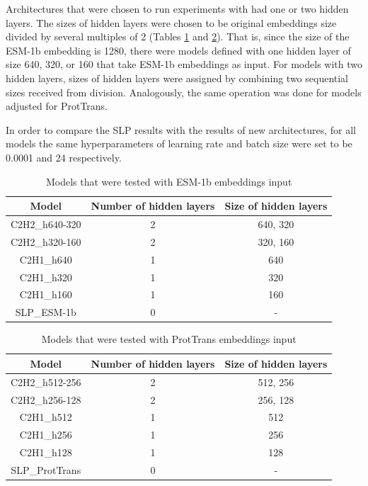\documentclass[12pt]{article}
\begin{document}
	Architectures that were chosen to run experiments with 
	had one or two hidden layers. The sizes of hidden layers 
	were chosen to be original embeddings size divided 
	by several multiples of 2 (Tables \ref{table:modelArchitecturesESM} 
	and \ref{table:modelArchitecturesPT}). That is, since the 
	size of the ESM-1b embedding is 1280, there were 
	models defined with one hidden layer of size 640, 320, or 160 
	that take ESM-1b embeddings as input. For models with two 
	hidden layers, sizes of hidden layers were assigned by 
	combining two sequential sizes received from division. 
	Analogously, the same operation was done for models adjusted 
	for ProtTrans.

	In order to compare the SLP results with the results of new 
	architectures, for all models the same hyperparameters 
	of learning rate and 
	batch size were set to be 0.0001 and 24 respectively.

	\begin{table}[h!]
		\caption{Models that were tested with ESM-1b embeddings input}
		\vspace{0.2cm}
		\centering
		\begin{tabular}{ | c | c c | }
			\hline 
			Model & Number of hidden layers & Size of hidden layers \\
			\hline 
			C2H2\_h640-320 & 2 & 640, 320 \\
			C2H2\_h320-160 & 2 & 320, 160 \\
			C2H1\_h640 & 1 & 640 \\
			C2H1\_h320 & 1 & 320 \\
			C2H1\_h160 & 1 & 160 \\
			SLP\_ESM-1b & 0 & - \\
			\hline    
		\end{tabular}
		\label{table:modelArchitecturesESM}
	\end{table}

	\begin{table}[h!]
		\caption{Models that were tested with ProtTrans embeddings input}
		\vspace{0.2cm}
		\centering
		\begin{tabular}{ | c | c c | }
			\hline 
			Model & Number of hidden layers & Size of hidden layers \\
			\hline 
			C2H2\_h512-256 & 2 & 512, 256 \\
			C2H2\_h256-128 & 2 & 256, 128 \\
			C2H1\_h512 & 1 & 512 \\
			C2H1\_h256 & 1 & 256 \\
			C2H1\_h128 & 1 & 128 \\
			SLP\_ProtTrans & 0 & - \\
			\hline    
		\end{tabular}
		\label{table:modelArchitecturesPT}
	\end{table}
\end{document}
